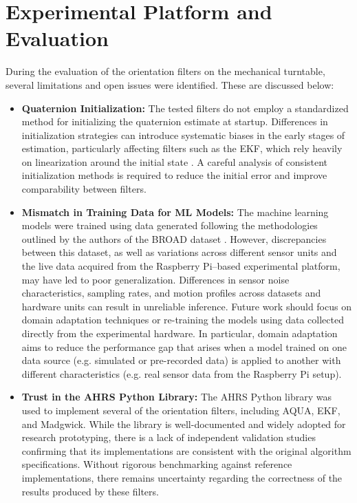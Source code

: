 \documentclass{iutbscthesis}
\begin{document}
\section{Experimental Platform and Evaluation}

During the evaluation of the orientation filters on the mechanical turntable, several limitations and open issues were identified. These are discussed below:

\begin{itemize}
    \item \textbf{Quaternion Initialization:} The tested filters do not employ a standardized method for initializing the quaternion estimate at startup. Differences in initialization strategies can introduce systematic biases in the early stages of estimation, particularly affecting filters such as the EKF, which rely heavily on linearization around the initial state \cite{ekf_ref}. A careful analysis of consistent initialization methods is required to reduce the initial error and improve comparability between filters.
    
    \item \textbf{Mismatch in Training Data for ML Models:} The machine learning models were trained using data generated following the methodologies outlined by the authors of the BROAD dataset \cite{BROAD}. However, discrepancies between this dataset, as well as variations across different sensor units and the live data acquired from the Raspberry Pi–based experimental platform, may have led to poor generalization. Differences in sensor noise characteristics, sampling rates, and motion profiles across datasets and hardware units can result in unreliable inference. Future work should focus on domain adaptation techniques or re-training the models using data collected directly from the experimental hardware. In particular, domain adaptation aims to reduce the performance gap that arises when a model trained on one data source (e.g. simulated or pre-recorded data) is applied to another with different characteristics (e.g. real sensor data from the Raspberry Pi setup).

    \item \textbf{Trust in the AHRS Python Library:} The AHRS Python library \cite{ahrs_doc} was used to implement several of the orientation filters, including AQUA, EKF, and Madgwick. While the library is well-documented and widely adopted for research prototyping, there is a lack of independent validation studies confirming that its implementations are consistent with the original algorithm specifications. Without rigorous benchmarking against reference implementations, there remains uncertainty regarding the correctness of the results produced by these filters.
    

\end{itemize}
\end{document}
